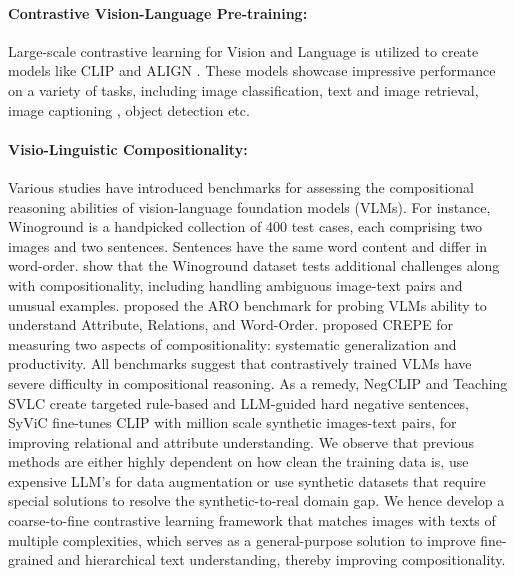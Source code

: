 \documentclass[11pt]{article}
\begin{document}
\paragraph{Contrastive Vision-Language Pre-training:}
Large-scale contrastive learning for Vision and Language is utilized to create models like CLIP \citep{radford2021learning} and ALIGN \citep{jia2021scaling}. These models showcase impressive performance on a variety of tasks, including image classification, text and image retrieval, image captioning \citep{mokady2021clipcap}, object detection \citep{zhong2022regionclip, li2022grounded} etc.
\paragraph{Visio-Linguistic Compositionality:}
Various studies have introduced benchmarks for assessing the compositional reasoning abilities of vision-language foundation models (VLMs). For instance, Winoground \citep{thrush2022winoground} is a handpicked collection of 400 test cases, each comprising two images and two sentences. Sentences have the same word content and differ in word-order. \citet{diwan-etal-2022-winoground} show that the Winoground dataset tests additional challenges along with compositionality, including handling ambiguous image-text pairs and unusual examples. \citet{yuksekgonul2022and} proposed the ARO benchmark for probing VLMs ability to understand Attribute, Relations, and Word-Order. \citet{ma2022crepe} proposed CREPE for measuring two aspects of compositionality: systematic generalization and productivity. All benchmarks suggest that contrastively trained VLMs have severe difficulty in compositional reasoning. As a remedy, NegCLIP \citep{yuksekgonul2022and} and Teaching SVLC \citep{doveh2023teaching} create targeted rule-based and LLM-guided hard negative sentences, SyViC \citep{cascantebonilla2023going} fine-tunes CLIP with million scale synthetic images-text pairs, for improving relational and attribute understanding. We observe that previous methods are either highly dependent on how clean the training data is, use expensive LLM's for data augmentation or use synthetic datasets that require special solutions to resolve the synthetic-to-real domain gap. We hence develop a coarse-to-fine contrastive learning framework that matches images with texts of multiple complexities, which serves as a general-purpose solution to improve fine-grained and hierarchical text understanding, thereby improving compositionality.
\end{document}
